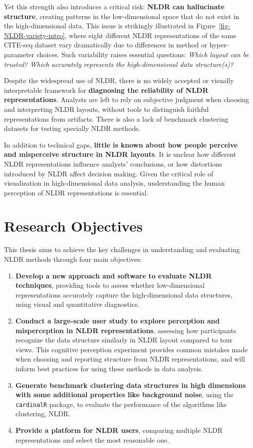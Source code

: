 \documentclass[
  11pt,
  a4paper,
]{report}
\begin{document}
Yet this strength also introduces a critical risk: \textbf{NLDR can
hallucinate structure}, creating patterns in the low-dimensional space
that do not exist in the high-dimensional data. This issue is strikingly
illustrated in Figure~\ref{fig-NLDR-variety-intro}, where eight
different NLDR representations of the same CITE-seq dataset vary
dramatically due to differences in method or hyper-parameter choices.
Such variability raises essential questions: \emph{Which layout can be
trusted? Which accurately represents the high-dimensional data
structure(s)?}

Despite the widespread use of NLDR, there is no widely accepted or
visually interpretable framework for \textbf{diagnosing the reliability
of NLDR representations}. Analysts are left to rely on subjective
judgment when choosing and interpreting NLDR layouts, without tools to
distinguish faithful representations from artifacts. There is also a
lack of benchmark clustering datasets for testing specially NLDR
methods.

In addition to technical gaps, \textbf{little is known about how people
perceive and misperceive structure in NLDR layouts}. It is unclear how
different NLDR representations influence analysts' conclusions, or how
distortions introduced by NLDR affect decision making. Given the
critical role of visualization in high-dimensional data analysis,
understanding the human perception of NLDR representations is essential.

\section{Research Objectives}\label{research-objectives}

This thesis aims to achieve the key challenges in understanding and
evaluating NLDR methods through four main objectives:

\begin{enumerate}
\def\labelenumi{\arabic{enumi}.}
\item
  \textbf{Develop a new approach and software to evaluate NLDR
  techniques}, providing tools to assess whether low-dimensional
  representations accurately capture the high-dimensional data
  structures, using visual and quantitative diagnostics.
\item
  \textbf{Conduct a large-scale user study to explore perception and
  misperception in NLDR representations}, assessing how participants
  recognize the data structure similarly in NLDR layout compared to tour
  views. This cognitive perception experiment provides common mistakes
  made when choosing and reporting structure from NLDR representations,
  and will inform best practices for using these methods in data
  analysis.
\item
  \textbf{Generate benchmark clustering data structures in high
  dimensions with some additional properties like background noise},
  using the \texttt{cardinalR} package, to evaluate the performance of
  the algorithms like clustering, NLDR.
\item
  \textbf{Provide a platform for NLDR users}, comparing multiple NLDR
  representations and select the most reasonable one.
\end{enumerate}
\end{document}
